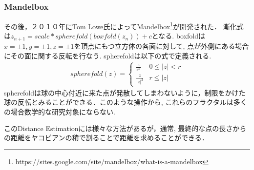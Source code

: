 \subsubsection{Mandelbox}
その後，２０１０年にTom Lowe氏によってMandelbox\footnote{https://sites.google.com/site/mandelbox/what-is-a-mandelbox}が開発された．
漸化式は$z_{n+1} = scale * spherefold(boxfold(z_n)) + c$となる.
boxfoldは$x=\pm1, y=\pm1, z=\pm1$を頂点にもつ立方体の各面に対して, 点が外側にある場合にその面に関する反転を行なう.
spherefoldは以下の式で定義される.
\begin{eqnarray*}
 spherefold(z) = \begin{cases}
                  \frac{z}{r^2} & 0 \le |z| < r \\
                  \frac{z}{|z|^2} & r \le |z|
                 \end{cases}
\end{eqnarray*}
spherefoldは球の中心付近に来た点が発散してしまわないように，制限をかけた球の反転とみることができる．このような操作から, これらのフラクタルは多くの場合数学的な研究対象にならない.

このDistance Estimationには様々な方法があるが，通常, 最終的な点の長さからの距離をヤコビアンの積で割ることで距離を求めることができる．

